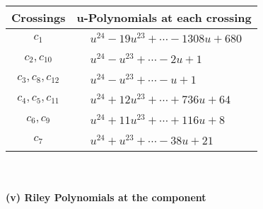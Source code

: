 \documentclass[1p]{elsarticle_modified}
\theoremstyle{definition}
\begin{document}
\begin{tabular}{m{50pt}|m{274pt}}
Crossings & \hspace{64pt}u-Polynomials at each crossing \\
\hline $$\begin{aligned}c_{1}\end{aligned}$$&$\begin{aligned}
&u^{24}-19 u^{23}+\cdots-1308 u+680
\end{aligned}$\\
\hline $$\begin{aligned}c_{2},c_{10}\end{aligned}$$&$\begin{aligned}
&u^{24}- u^{23}+\cdots-2 u+1
\end{aligned}$\\
\hline $$\begin{aligned}c_{3},c_{8},c_{12}\end{aligned}$$&$\begin{aligned}
&u^{24}- u^{23}+\cdots- u+1
\end{aligned}$\\
\hline $$\begin{aligned}c_{4},c_{5},c_{11}\end{aligned}$$&$\begin{aligned}
&u^{24}+12 u^{23}+\cdots+736 u+64
\end{aligned}$\\
\hline $$\begin{aligned}c_{6},c_{9}\end{aligned}$$&$\begin{aligned}
&u^{24}+11 u^{23}+\cdots+116 u+8
\end{aligned}$\\
\hline $$\begin{aligned}c_{7}\end{aligned}$$&$\begin{aligned}
&u^{24}+u^{23}+\cdots-38 u+21
\end{aligned}$\\
\hline
\end{tabular}\\~\\
\newpage\renewcommand{\arraystretch}{1}
\flushleft \textbf{(v) Riley Polynomials at the component}\newline \\
\end{document}
